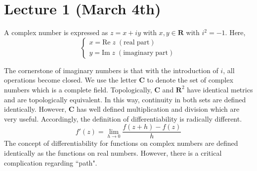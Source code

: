 \section{Lecture 1 (March 4th)}
\begin{defi}
A complex number is expressed as $z=x+iy$ with $x,y\in {\bm R}$ with $i^2=-1$. Here,
\[\begin{cases}
x=\mathrm{Re}\;z\;\mathrm{(real\;part)}\\
y=\mathrm{Im}\;z\;\mathrm{(imaginary\;part)}
\end{cases}\]
\end{defi}
\vspace{2ex}
The cornerstone of imaginary numbers is that with the introduction of $i$, all operations become closed. We use the letter ${\bm C}$ to denote the set of complex numbers which is a complete field. Topologically, ${\bm C}$ and ${\bm R}^2$ have identical metrics and are topologically equivalent. In this way, continuity in both sets are defined identically. However, ${\bm C}$ has well defined multiplication and division which are very useful. Accordingly, the definition of differentiability is radically different.
\[f'(z)=\lim _{h\rightarrow 0}\dfrac{f(z+h)-f(z)}{h}\]
The concept of differentiability for functions on complex numbers are defined identically as the functions on real numbers. However, there is a critical complication regarding ``path". 

